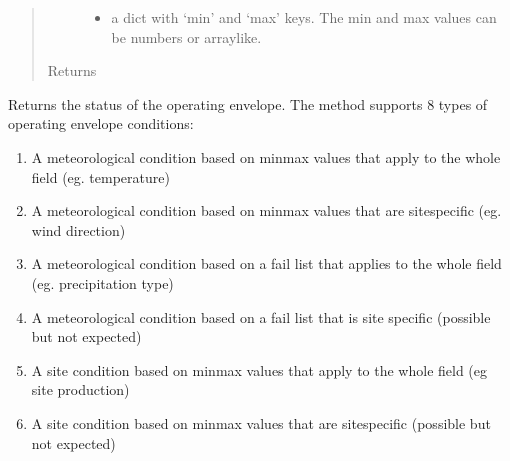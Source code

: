 \documentclass[letterpaper,10pt,english]{sphinxmanual}
\begin{document}
\begin{fulllineitems}
\begin{fulllineitems}
\begin{quote}
\begin{description}
\begin{itemize}
\item {} 
 \textendash{} a dict with ‘min’ and ‘max’ keys. The min and max values can be numbers or array\sphinxhyphen{}like.

\end{itemize}

\item[{Returns}] \leavevmode


\end{description}\end{quote}

\end{fulllineitems}


\begin{fulllineitems}
\label{\detokenize{index:feast.DetectionModules.abstract_detection_method.DetectionMethod.check_op_envelope}}
Returns the status of the operating envelope. The method supports 8 types of operating envelope conditions:
\begin{enumerate}
%
\item {} 
A meteorological condition based on min\sphinxhyphen{}max values that apply to the whole field (eg. temperature)

\item {} 
A meteorological condition based on min\sphinxhyphen{}max values that are site\sphinxhyphen{}specific (eg. wind direction)

\item {} 
A meteorological condition based on a fail list that applies to the whole field (eg. precipitation type)

\item {} 
A meteorological condition based on a fail list that is site specific (possible but not expected)

\item {} 
A site condition based on min\sphinxhyphen{}max values that apply to the whole field (eg site production)

\item {} 
A site condition based on min\sphinxhyphen{}max values that are site\sphinxhyphen{}specific (possible but not expected)


\end{enumerate}
\end{fulllineitems}
\end{fulllineitems}
\end{document}
